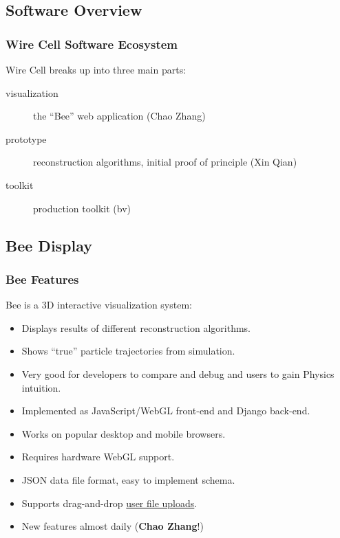 \documentclass[xcolor=dvipsnames]{beamer}
\begin{document}
\subsection{Software Overview}

\begin{frame}
  \frametitle{Wire Cell Software Ecosystem}

  Wire Cell breaks up into three main parts:

  \begin{description}
  \item[visualization] the ``Bee'' web application (Chao Zhang)
  \item[prototype] reconstruction algorithms, initial proof of
    principle (Xin Qian)
  \item[toolkit] production toolkit (bv)
  \end{description}

\end{frame}

\subsection{Bee Display}

\begin{frame}
  \frametitle{Bee Features}

  Bee is a 3D interactive visualization system:
  \begin{itemize}
  \item Displays results of different reconstruction algorithms.
  \item Shows ``true'' particle trajectories from simulation.
  \item Very good for developers to compare and debug and users to
    gain Physics intuition.
  \item Implemented as JavaScript/WebGL front-end and Django back-end.
  \item Works on popular desktop and mobile browsers.
  \item Requires hardware WebGL support.
  \item JSON data file format, easy to implement schema.
  \item Supports drag-and-drop
    \href{http://bnlif.github.io/wire-cell-docs/viz/uploads/}{user
      file uploads}.
  \item New features almost daily (\textbf{Chao Zhang}!)
  \end{itemize}
\end{frame}
\end{document}
